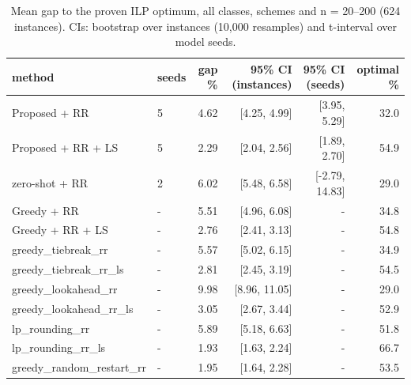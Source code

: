 \begin{table}[t]
\centering
\caption{Mean gap to the proven ILP optimum, all classes, schemes and n = 20--200 (624 instances). CIs: bootstrap over instances (10,000 resamples) and t-interval over model seeds.}
\label{tab:main_pooled}
\scriptsize
\begin{tabular}{llrrrr}
\toprule
method & seeds & gap \% & 95\% CI (instances) & 95\% CI (seeds) & optimal \% \\
\midrule
Proposed + RR & 5 & 4.62 & [4.25, 4.99] & [3.95, 5.29] & 32.0 \\
Proposed + RR + LS & 5 & 2.29 & [2.04, 2.56] & [1.89, 2.70] & 54.9 \\
zero-shot + RR & 2 & 6.02 & [5.48, 6.58] & [-2.79, 14.83] & 29.0 \\
Greedy + RR & - & 5.51 & [4.96, 6.08] & - & 34.8 \\
Greedy + RR + LS & - & 2.76 & [2.41, 3.13] & - & 54.8 \\
greedy\_tiebreak\_rr & - & 5.57 & [5.02, 6.15] & - & 34.9 \\
greedy\_tiebreak\_rr\_ls & - & 2.81 & [2.45, 3.19] & - & 54.5 \\
greedy\_lookahead\_rr & - & 9.98 & [8.96, 11.05] & - & 29.0 \\
greedy\_lookahead\_rr\_ls & - & 3.05 & [2.67, 3.44] & - & 52.9 \\
lp\_rounding\_rr & - & 5.89 & [5.18, 6.63] & - & 51.8 \\
lp\_rounding\_rr\_ls & - & 1.93 & [1.63, 2.24] & - & 66.7 \\
greedy\_random\_restart\_rr & - & 1.95 & [1.64, 2.28] & - & 53.5 \\
\bottomrule
\end{tabular}
\end{table}
